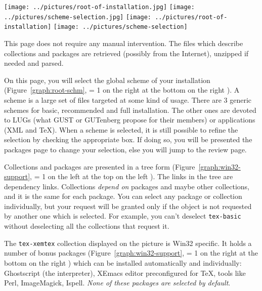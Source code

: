 \documentclass{article}
\begin{document}
\begin{description}
\begin{figure*}[!htb]
\begin{center}
\texttt{[image: ../pictures/root-of-installation.jpg]}
\texttt{[image: ../pictures/scheme-selection.jpg]}
    \else
        \texttt{[image: ../pictures/root-of-installation]}%
                        \hfill%
        \texttt{[image: ../pictures/scheme-selection]}
    \fi
  \fi
 \caption{\TeXLive-Setup: Root and directories / Schemes}\label{graph:root-schm}
 \end{center}
\end{figure*}
\item[Get TPM Page] 
  This page does not require any manual intervention. The 
  files which describe collections and packages are retrieved
  (possibly from the Internet), unzipped if needed and parsed.
\item[Schemes Page]
  On this page, you will select the global scheme of your
  installation (Figure~\ref{graph:root-schm}, 
  \ifnum \Status = 1
  on the right%
  \else\ifnum {}
  at the bottom%
  \else
  on the right%
  \fi\fi
  ). A scheme is a large set of files targeted at some kind
  of usage. There are 3 generic schemes for basic, recommended and
  full installation. The other ones are devoted to LUGs (what GUST or
  GUTenberg propose for their members) or applications (XML and
  \TeX{}).
  When a scheme is selected, it is still possible to refine the
  selection by checking the appropriate box. If doing so, you will be
  presented the packages page to change your selection, else you will
  jump to the review page.
\item[Packages Page] 
  Collections and packages are presented in a tree form
  (Figure~\ref{graph:win32-support}, 
  \ifnum \Status = 1
  on the left%
  \else\ifnum {}
  at the top%
  \else
  on the left%
  \fi\fi
  ). The links
  in the tree are dependency links. Collections \emph{depend on}
  packages and maybe other collections, and it is the same for each
  package. You can select any package or collection individually, but
  your request will be granted only if the object is not requested by
  another one which is selected. For example, you can't deselect
  \texttt{tex-basic} without deselecting all the collections that
  request it.

  The \texttt{tex-xemtex} collection displayed on the picture is Win32 specific. It
  holds a number of bonus packages (Figure~\ref{graph:win32-support}, 
  \ifnum \Status = 1
  on the right%
  \else\ifnum {}
  at the bottom%
  \else
  on the right%
  \fi\fi
  ) which can be installed
  automatically and individually: Ghostscript (the \PS{}
  interpreter), XEmacs editor preconfigured for \TeX{}, tools like Perl,
  ImageMagick, Ispell. \emph{None of these packages are selected by
  default}. 


\end{description}
\end{document}
